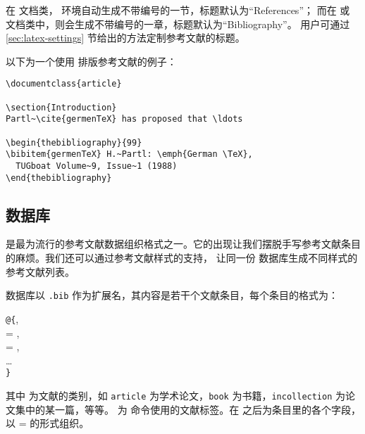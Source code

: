 在  文档类， 环境自动生成不带编号的一节，标题默认为“References”；
而在  或  文档类中，则会生成不带编号的一章，标题默认为“Bibliography”。
用户可通过 \ref{sec:latex-settings} 节给出的方法定制参考文献的标题。

以下为一个使用  排版参考文献的例子：
\begin{verbatim}
\documentclass{article}

\section{Introduction}
Partl~\cite{germenTeX} has proposed that \ldots

\begin{thebibliography}{99}
\bibitem{germenTeX} H.~Partl: \emph{German \TeX},
  TUGboat Volume~9, Issue~1 (1988)
\end{thebibliography}

\end{verbatim}

\subsection{ 数据库}\label{subsec:bibtex-data}

 是最为流行的参考文献数据组织格式之一。它的出现让我们摆脱手写参考文献条目的麻烦。我们还可以通过参考文献样式的支持，
让同一份  数据库生成不同样式的参考文献列表。

 数据库以 \texttt{.bib} 作为扩展名，其内容是若干个文献条目，每个条目的格式为：
\begin{command}
\texttt @\texttt\{, \\
\qquad{} = , \\
\qquad{} = , \\
\qquad\ldots\\
\texttt\}
\end{command}

其中  为文献的类别，如 \texttt{article} 为学术论文，\texttt{book} 为书籍，\texttt{in\-collection} 为论文集中的某一篇，等等。
 为  命令使用的文献标签。在  之后为条目里的各个字段，以  =  的形式组织。

